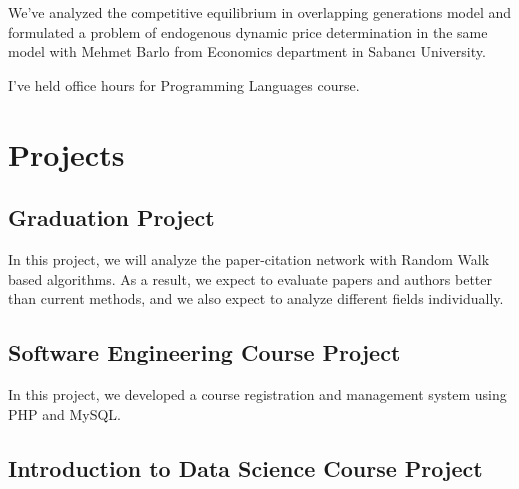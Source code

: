 \documentclass[letterpaper]{deedy-resume} %
\begin{document}
\begin{minipage}[t]{0.66\textwidth}

We've analyzed the competitive equilibrium in overlapping generations model and formulated a problem of endogenous dynamic price determination in the same model with Mehmet Barlo from Economics department in Sabancı University.

\sectionspace %


I've held office hours for Programming Languages course.

\sectionspace %


\section{Projects} 

\subsection{Graduation Project}

In this project, we will analyze the paper-citation network with Random Walk based algorithms. As a result, we expect to evaluate papers and authors better than current methods, and we also expect to analyze different fields individually.

\sectionspace %

\subsection{Software Engineering Course Project}

In this project, we developed a course registration and management system using PHP and MySQL.

\sectionspace %

\subsection{Introduction to Data Science Course Project}


\end{minipage}
\end{document}
